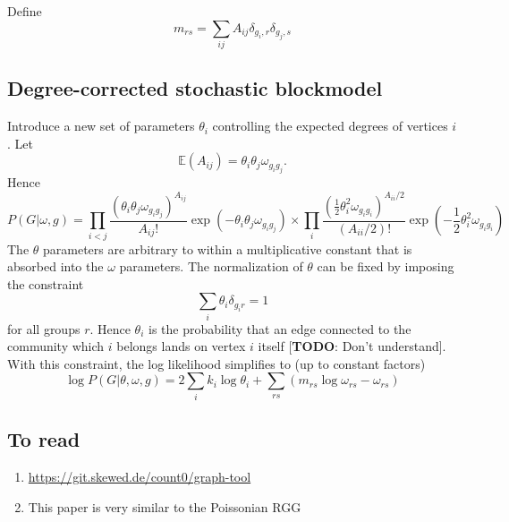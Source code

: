 \documentclass[11pt]{article}
\numberwithin{equation}{section}
\begin{document}
Define 
\begin{equation}
m_{rs} = \sum_{ij} A_{ij} \delta_{g_i, r} \delta_{g_j, s}
\end{equation}

\subsection{Degree-corrected stochastic blockmodel}
Introduce a new set of parameters $\theta_i$ controlling the expected degrees of vertices $i$. Let
\begin{equation}
\mathbb{E}(A_{ij}) = \theta_i \theta_j \omega_{g_i g_j}.
\end{equation}
Hence
\begin{equation}
P(G|\omega, g) = \prod_{i<j} \frac{(\theta_i \theta_j \omega_{g_i g_j})^{A_{ij}}}{A_{ij}!}\exp(- \theta_i \theta_j \omega_{g_i g_j}) \times \prod_{i} \frac{(\frac{1}{2} \theta_i^2 \omega_{g_i g_i})^{A_{ii}/2}}{(A_{ii}/2)!}\exp(- \frac{1}{2} \theta_i^2 \omega_{g_i g_i})
\end{equation}
The $\theta$ parameters are arbitrary to within a multiplicative constant that is absorbed into the $\omega$ parameters. The normalization of $\theta$ can be fixed by imposing the constraint
\begin{equation}
\sum_i \theta_i \delta_{g_i r} = 1
\end{equation}
for all groups $r$. Hence $\theta_i$ is the probability that an edge connected to the community which $i$ belongs lands on vertex $i$ itself [\textbf{TODO}: Don't understand]. With this constraint, the log likelihood simplifies to (up to constant factors)
\begin{equation}
\log P(G|\theta, \omega, g) = 2 \sum_i k_i \log \theta_i + \sum_{rs} (m_{rs} \log \omega_{rs} - \omega_{rs})
\end{equation}

\subsection{To read}
\begin{enumerate}
\item \url{https://git.skewed.de/count0/graph-tool}
\item This paper is very similar to the Poissonian RGG \citep{Peixoto20}
\end{enumerate}



\newpage
 
\end{document}
